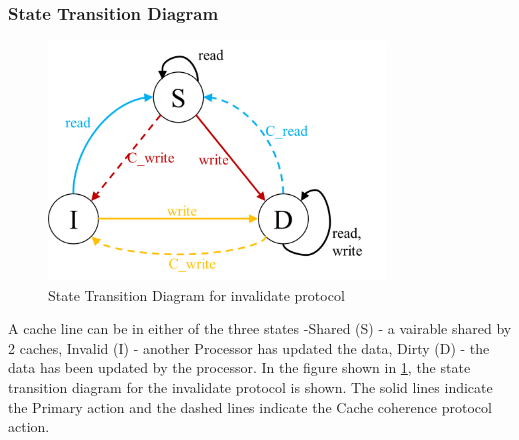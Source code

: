 \documentclass[12pt]{article}
\begin{document}
\subsubsection{State Transition Diagram}
\begin{figure}[H]
    \centering
    \includegraphics[width=0.8\textwidth]{images/state_dia.png}
    \caption{State Transition Diagram for invalidate protocol}
    \label{fig:state_transition}
\end{figure}
A cache line can be in either of the three states -Shared (S) - a vairable shared by 2 caches,
Invalid (I) - another Processor has updated the data, Dirty (D) - the data has been updated by the processor.
In the figure shown in \ref{fig:state_transition}, the state transition diagram for the invalidate protocol is shown.
The solid lines indicate the Primary action and the dashed lines indicate the Cache coherence protocol action.
\end{document}
